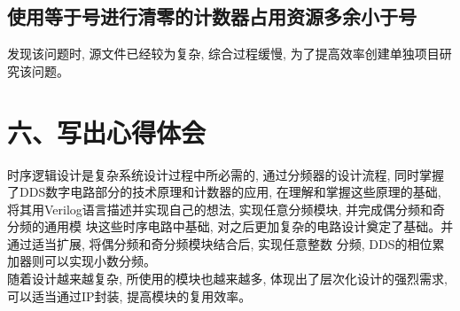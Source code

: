 \documentclass{article}
\newcommand{\fourhao}{\fontsize{14pt}{\baselineskip}\selectfont} %
\newcommand{\xiaosihao}{\fontsize{12pt}{\baselineskip}\selectfont} %
\begin{document}
\subsection*{使用等于号进行清零的计数器占用资源多余小于号}
发现该问题时, 源文件已经较为复杂, 综合过程缓慢, 为了提高效率创建单独项目研究该问题。

\section*{\fourhao 六、写出心得体会}
\xiaosihao
{}
时序逻辑设计是复杂系统设计过程中所必需的, 通过分频器的设计流程, 同时掌握了DDS数字电路部分的技术原理和计数器的应用, 
在理解和掌握这些原理的基础, 将其用Verilog语言描述并实现自己的想法, 实现任意分频模块, 并完成偶分频和奇分频的通用模
块这些时序电路中基础, 对之后更加复杂的电路设计奠定了基础。并通过适当扩展, 将偶分频和奇分频模块结合后, 实现任意整数
分频, DDS的相位累加器则可以实现小数分频。\\
随着设计越来越复杂, 所使用的模块也越来越多, 体现出了层次化设计的强烈需求, 可以适当通过IP封装, 提高模块的复用效率。
\end{document}
